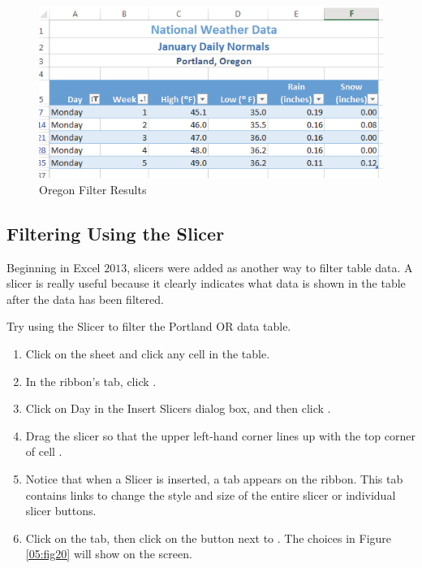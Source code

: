 \begin{figure}[H]
	\centering
	\includegraphics[width=\maxwidth{.95\linewidth}]{gfx/ch05_fig19}
	\caption{Oregon Filter Results}
	\label{05:fig19}
\end{figure}

\subsection{Filtering Using the Slicer}

Beginning in Excel $ 2013 $, slicers were added as another way to filter table data. A slicer is really useful because it clearly indicates what data is shown in the table after the data has been filtered.

Try using the Slicer to filter the Portland OR data table.

\begin{enumerate}
	\item Click on the  sheet and click any cell in the table.
	\item In the ribbon's  tab, click .
	\item Click on Day in the Insert Slicers dialog box, and then click .
	\item Drag the slicer so that the upper left-hand corner lines up with the top corner of cell .
	\item Notice that when a Slicer is inserted, a  tab appears on the ribbon. This tab contains links to change the style and size of the entire slicer or individual slicer buttons.
	\item Click on the  tab, then click on the  button next to . The choices in Figure \ref{05:fig20} will show on the screen.
\end{enumerate}

